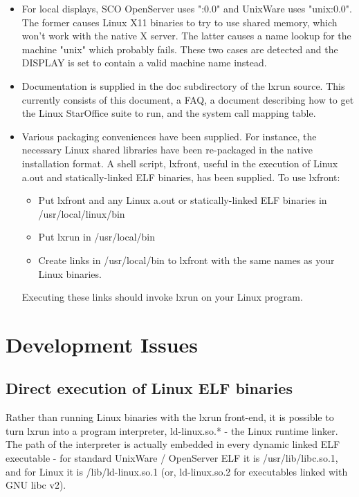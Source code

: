 \documentclass[letterpaper]{article}
\begin{document}
\begin{itemize}
\item  For local displays, SCO OpenServer uses ":0.0" and UnixWare uses
"unix:0.0".  The former causes Linux X11 binaries to try to
use shared memory, which won't work with the native X server.
The latter causes a name lookup for the machine "unix" which
probably fails. These two cases are detected and the DISPLAY
is set to contain a valid machine name instead.
\item  Documentation is supplied in the {\ttfamily doc} subdirectory of the lxrun
source. This currently consists of this document, a FAQ, a document
describing how to get the Linux StarOffice suite to run, and the system
call mapping table.
\item  Various packaging conveniences have been supplied. For instance, the
necessary Linux shared libraries have been re-packaged in the native
installation format. A shell script, lxfront, useful in the execution
of Linux a.out and statically-linked ELF binaries, has been supplied.
To use lxfront:
\begin{itemize}
\item  Put lxfront and any Linux a.out or statically-linked ELF 
binaries in /usr/local/linux/bin
\item  Put lxrun in /usr/local/bin
\item  Create links in /usr/local/bin to lxfront with the same 
names as your Linux binaries.
\end{itemize}

Executing these links should invoke lxrun on your Linux program.
\end{itemize}





\section{Development Issues}






\subsection{Direct execution of Linux ELF binaries\label{sec-direct}}

Rather than running Linux binaries with the lxrun front-end, it is possible
to turn lxrun into a program interpreter, ld-linux.so.* - the Linux runtime 
linker. The path of the interpreter is actually embedded in every dynamic 
linked ELF executable - for standard UnixWare / OpenServer ELF it is
/usr/lib/libc.so.1, and for Linux it is /lib/ld-linux.so.1 (or, ld-linux.so.2
for executables linked with GNU libc v2). 
\end{document}
